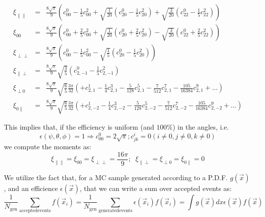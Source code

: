 \documentclass[a4paper,9pt,twoside]{article}
\begin{document}
\begin{eqnarray}
    \xi_{\parallel\parallel} &=& \frac{8 \sqrt{\pi}}{9} \left( c^0_{00}-\frac{1}{5}c^2_{00}+\sqrt{\frac{1}{20}}\left(c^0_{20}-\frac{1}{5}c^2_{20}\right)+\sqrt{\frac{3}{20}}\left(c^0_{22}-\frac{1}{5}c^2_{22}\right)  \right)  \\
    \xi_{00}                 &=& \frac{8 \sqrt{\pi}}{9} \left( c^0_{00}+\frac{2}{5}c^2_{00}+\sqrt{\frac{1}{20}}(c^0_{20}+\frac{2}{5}c^2_{20})-\sqrt{\frac{3}{20}}(c^0_{22}+\frac{2}{5}c^2_{22}) \right) \\
    \xi_{\perp\perp}         &=& \frac{8 \sqrt{\pi}}{9} \left( c^0_{00}-\frac{1}{5}c^2_{00} - \sqrt{\frac{1}{5}}\left(c^0_{20}-\frac{1}{5}c^2_{20}\right)\right)\\
    \xi_{\parallel\perp}     &=& \frac{8 \sqrt{\pi}}{9} \sqrt{\frac{3}{5}}\left(c^0_{2,-1}-\frac{1}{5}c^2_{2,-1}\right)  \\
    \xi_{\perp 0}            &=& \frac{8 \sqrt{\pi}}{9} \sqrt{\frac{6}{5}}\frac{3\pi}{32}\left( +c^1_{2,1} -\frac{1}{4}c^3_{2,1}- \frac{5}{128}c^5_{2,1} -\frac{7}{512}c^7_{2,1} - \frac{105}{16384}c^9_{2,1}+... \right) \\
    \xi_{0\parallel}         &=& \frac{8 \sqrt{\pi}}{9} \sqrt{\frac{6}{5}}\frac{3\pi}{32}\left( +c^1_{2,-2}-\frac{1}{4}c^3_{2,-2}-\frac{5}{128}c^5_{2,-2}-\frac{7}{512}c^7_{2,-2} - \frac{105}{16384}c^9_{2,-2}+... \right) 
\end{eqnarray}

This implies that, if the efficiency is uniform (and $100\%$) in the angles, i.e.
\begin{equation}
   \epsilon(\psi,\theta,\phi) = 1 \Rightarrow c^0_{00} = 2\sqrt{\pi} ; c^{i}_{jk} = 0 (i\neq 0, j\neq 0, k \neq 0)
\end{equation}
we compute the moments as:
\begin{equation}
    \xi_{\parallel\parallel}= \xi_{00}= \xi_{\perp\perp}  = \frac{16\pi}{9};\;\; \xi_{\parallel\perp} =\xi_{\perp 0} = \xi_{0\parallel} = 0
\end{equation}



We utilize the fact that, for a MC sample generated according to a P.D.F. $g(\vec{x})$,
and an efficience $\epsilon(\vec{x})$, that we can write a sum over accepted events as:
\begin{equation}
  \frac{1}{N_{\mathrm{gen}}} \sum_{\mathrm{accepted events}} f(\vec{x}_i) = \frac{1}{N_{\mathrm{gen}}} \sum_{\mathrm{generated events}} \epsilon(\vec{x}_i) f(\vec{x}_i) =  \int g(\vec{x})dx \epsilon(\vec{x}) f(\vec{x})
\end{equation}
\end{document}
